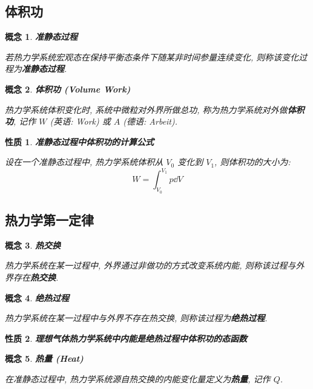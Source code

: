 \documentclass[UTF8]{ctexart}
\newcommand{\<}{\langle}
\renewcommand{\>}{\rangle}                              %
\newenvironment{dfn_box}{
    \begin{tcolorbox}[enhanced, colback=dfn_green2, boxrule=0pt, frame hidden,
        borderline west={0.7mm}{0.1mm}{dfn_green1},breakable]
    }
    {\end{tcolorbox}}
\newenvironment{ppt_box}{
    \begin{tcolorbox}[enhanced, colback=ppt_pink2, boxrule=0pt, frame hidden,
        borderline west={0.7mm}{0.1mm}{ppt_pink1},breakable]
    }
    {\end{tcolorbox}}
\theoremstyle{MyStyle} %
\newtheorem{definition}{概念}[subsection]
\newenvironment{cpt}{\begin{dfn_box}\begin{definition}}{\end{definition}\end{dfn_box}}
\newtheorem{property}{性质}[definition]
\newenvironment{ppt}{\begin{ppt_box}\begin{property}}{\end{property}\end{ppt_box}}
\begin{document}
    \subsection{体积功}
        
        \begin{cpt}
            \textbf{准静态过程}

            若热力学系统宏观态在保持平衡态条件下随某非时间参量连续变化, 则称该变化过程为\textbf{准静态过程}. 
        \end{cpt}
        
        \begin{cpt}
            \textbf{体积功 (Volume Work)}

            热力学系统体积变化时, 系统中微粒对外界所做总功, 称为热力学系统对外做\textbf{体积功}, 记作 \(W\) (英语: Work) 或 \(A\) (德语: Arbeit). 
        \end{cpt}

        \begin{ppt}
            \textbf{准静态过程中体积功的计算公式}

            设在一个准静态过程中, 热力学系统体积从 \(V_0\) 变化到 \(V_1\), 则体积功的大小为: 
            \[W=\int_{V_0}^{V_1}p\dd V\]
        \end{ppt}

    \subsection{热力学第一定律}
        
        \begin{cpt}
            \textbf{热交换}

            热力学系统在某一过程中, 外界通过非做功的方式改变系统内能, 则称该过程与外界存在\textbf{热交换}. 
        \end{cpt}
        
        \begin{cpt}
            \textbf{绝热过程}

            热力学系统在某一过程中与外界不存在热交换, 则称该过程为\textbf{绝热过程}. 
        \end{cpt}
        
        \begin{ppt}
            \textbf{理想气体热力学系统中内能是绝热过程中体积功的态函数}
        \end{ppt}
        
        \begin{cpt}
            \textbf{热量 (Heat)}

            在准静态过程中, 热力学系统源自热交换的内能变化量定义为\textbf{热量}, 记作 \(Q\). 
        \end{cpt}
        
\end{document}
